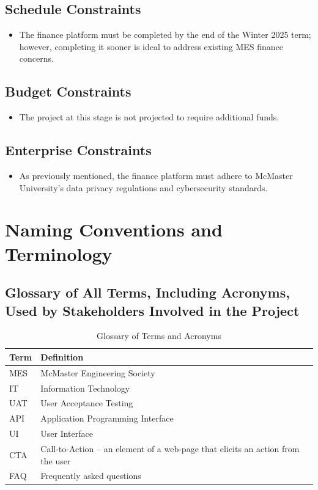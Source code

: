 \documentclass[12pt]{article}
\begin{document}
\subsection{Schedule Constraints}
\begin{itemize}
    \item The finance platform must be completed by the end of the Winter 2025 term; however, completing it sooner is ideal to address existing MES finance concerns.
\end{itemize}


\subsection{Budget Constraints}
\begin{itemize}
    \item The project at this stage is not projected to require additional funds.
\end{itemize}

\subsection{Enterprise Constraints}
\begin{itemize}
    \item As previously mentioned, the finance platform must adhere to McMaster University’s data privacy regulations and cybersecurity standards.
\end{itemize}

\section{Naming Conventions and Terminology}
\subsection{Glossary of All Terms, Including Acronyms, Used by Stakeholders Involved in the Project}
\begin{table}[h]
    \centering
    \begin{tabular}{|>{\raggedright}p{3cm}|>{\raggedright\arraybackslash}p{10cm}|}
        \hline
        \textbf{Term} & \textbf{Definition} \\
        \hline
        MES & McMaster Engineering Society \\
        \hline
        IT & Information Technology \\
        \hline
        UAT & User Acceptance Testing \\
        \hline
        API & Application Programming Interface \\
        \hline
        UI & User Interface \\
        \hline
        CTA & Call-to-Action – an element of a web-page that elicits an action from the user \\
        \hline
        FAQ & Frequently asked questions \\
        \hline
    \end{tabular}
    \caption{Glossary of Terms and Acronyms}
    \label{tab:glossary}
\end{table}
\end{document}
